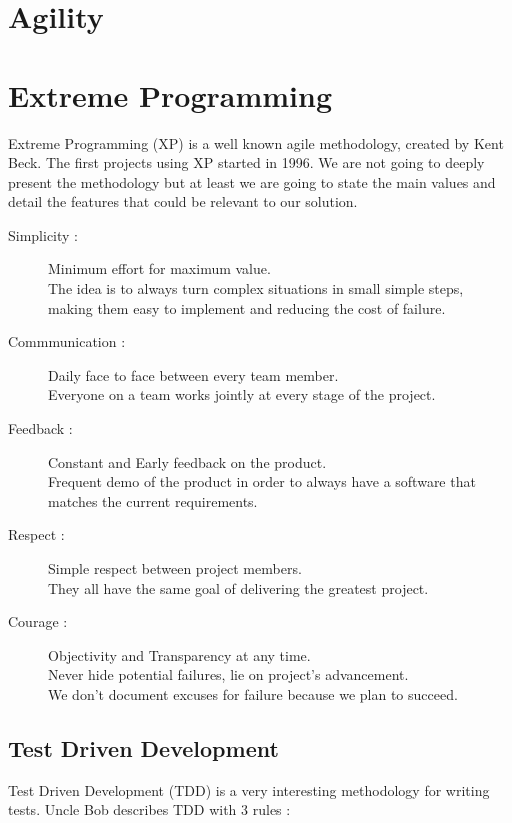 \section{Agility}\label{sec:agility}


\section{Extreme Programming}\label{sec:extreme-programming}
Extreme Programming (XP) is a well known agile methodology, created by
Kent Beck.
The first projects using XP started in 1996.
We are not going to deeply present the methodology but at least we are
going to state the main values and detail the features that could be
relevant to our solution.

\begin{description}
    \item[Simplicity :] Minimum effort for maximum value. \\
    The idea is to always turn complex situations in small simple steps,
    making them easy to implement and reducing the cost of failure.
    \item[Commmunication :] Daily face to face between every team member. \\
    Everyone on a team works jointly at every stage of the project.
    \item[Feedback :] Constant and Early feedback on the product. \\
    Frequent demo of the product in order to always have a software that
    matches the current requirements.
    \item[Respect :] Simple respect between project members. \\
    They all have the same goal of delivering the greatest project.
    \item[Courage :] Objectivity and Transparency at any time. \\
    Never hide potential failures, lie on project's advancement. \\
    We don't document excuses for failure because we plan to succeed.
\end{description}

\subsection{Test Driven Development}
\label{subsec:test-driven-development}
Test Driven Development (TDD) is a very interesting methodology for
writing tests.
Uncle Bob describes TDD with 3 rules :

